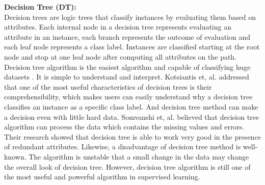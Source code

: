 \documentclass[12pt]{article}
\begin{document}
\textbf{Decision Tree (DT):\\}
Decision trees are logic trees that classify instances by evaluating them based on attributes. Each internal node in a decision tree represents evaluating an attribute in an instance, each branch represents the outcome of evaluation and each leaf node represents a class label. Instances are classified starting at the root node and stop at one leaf node after computing all attributes on the path. Decision tree algorithm is the easiest algorithm and capable of classifying huge datasets \cite{Somvanshi}.
It is simple to understand and interpret. Kotsiantis et, al. \cite{Kotsiantis}addressed that one of the most useful characteristics of decision trees is their comprehensibility, which makes users can easily understand why a decision tree classifies an instance as a specific class label. And decision tree method can make a decision even with little hard data. Somvanshi et, al. \cite{Somvanshi} believed that decision tree algorithm can process the data which contains the missing values and errors. Their research showed that decision tree is able to work very good in the presence of redundant attributes. Likewise, a disadvantage of decision tree method is well-known. The algorithm is unstable that a small change in the data may change the overall look of decision tree. However, decision tree algorithm is still one of the most useful and powerful algorithm in supervised learning. 
\\\\\\
\end{document}
